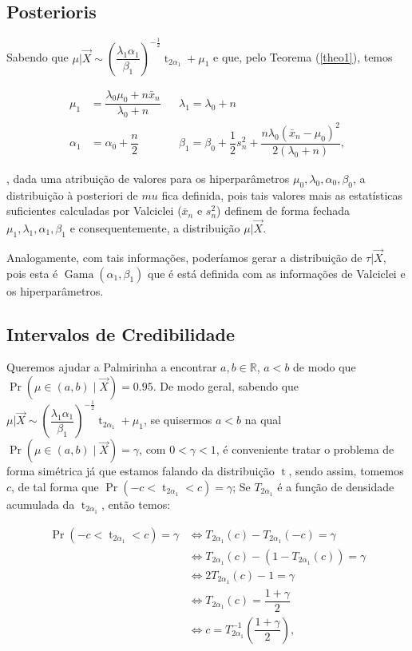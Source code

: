 \documentclass[a4paper]{article}
\newcommand{\op}[1]{{\operatorname{#1}}}
\newcommand{\vX}{\vec X}
\newcommand{\xn}{\bar{x}_n}
\newcommand{\sn}{s^2_n}
\begin{document}
\subsection{Posterioris}

Sabendo que $\mu|\vX\sim \left(\dfrac{\lambda_1\alpha_1}{\beta_1}\right)^{-\frac12}\op{t}_{2\alpha_1}+\mu_1$ e que, pelo Teorema (\ref{theo1}), temos

	\begin{align*}
\mu_1&=\dfrac{\lambda_0\mu_0+n\xn}{\lambda_0+n}&&\lambda_1=\lambda_0+n\\
\alpha_1&=\alpha_0+\dfrac n 2&&\beta_1=\beta_0+\dfrac12\sn+\dfrac{n\lambda_0(\xn-\mu_0)^2}{2(\lambda_0+n)},
\end{align*}

, dada uma atribuição de valores para os hiperparâmetros $\mu_0,\lambda_0,\alpha_0,\beta_0$, a distribuição à posteriori de $mu$ fica definida, pois tais valores mais as estatísticas suficientes calculadas por Valciclei ($\xn$ e $\sn$) definem de forma fechada $\mu_1,\lambda_1,\alpha_1,\beta_1$ e consequentemente, a distribuição $\mu|\vX$.

Analogamente, com tais informações, poderíamos gerar a distribuição de $\tau|\vX$, pois esta é $\op{Gama}(\alpha_1,\beta_1)$ que é está definida com as informações de Valciclei e os hiperparâmetros.

\subsection{Intervalos de Credibilidade}

Queremos ajudar a Palmirinha a encontrar $a, b \in \mathbb{R}$, $a < b$ de modo que $\operatorname{Pr}(\mu \in (a, b) \mid \vX) = 0.95$. De modo geral, sabendo que $\mu|\vX\sim \left(\dfrac{\lambda_1\alpha_1}{\beta_1}\right)^{-\frac12}\op{t}_{2\alpha_1}+\mu_1$, se quisermos $a<b$ na qual $\operatorname{Pr}(\mu \in (a, b) \mid \vX) = \gamma$, com $0<\gamma <1$, é conveniente tratar o problema de forma simétrica já que estamos falando da distribuição $\op{t}$, sendo assim, tomemos $c$, de tal forma que $\op{Pr}(-c<\op{t}_{2\alpha_1}<c)=\gamma$; Se $T_{2\alpha_1}$ é a função de densidade acumulada da $\op{t}_{2\alpha_1}$, então temos:

\begin{align*}
	\op{Pr}(-c<\op{t}_{2\alpha_1}<c)=\gamma&\Leftrightarrow T_{2\alpha_1}(c)-T_{2\alpha_1}(-c)=\gamma\\
	&\Leftrightarrow T_{2\alpha_1}(c)-(1-T_{2\alpha_1}(c))=\gamma\\
	&\Leftrightarrow 2T_{2\alpha_1}(c)-1=\gamma\\
	&\Leftrightarrow T_{2\alpha_1}(c)=\dfrac{1+\gamma}{2}\\
	&\Leftrightarrow c = T^{-1}_{2\alpha_1}\left(\dfrac{1+\gamma}{2}\right),
\end{align*}
\end{document}
